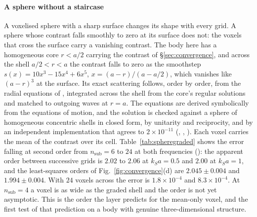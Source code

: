 \documentclass[preprint,review,12pt]{elsarticle}
\begin{document}
\paragraph{A sphere without a staircase} A voxelised sphere with a sharp surface changes its shape
with every grid. A sphere whose contrast falls smoothly to zero at its surface does not: the voxels
that cross the surface carry a vanishing contrast. The body here has a homogeneous core $r<a/2$
carrying the contrast of \S\ref{sec:convergence}, and across the shell $a/2<r<a$ the contrast falls to
zero as the smoothstep $s(x)=10x^3-15x^4+6x^5$, $x=(a-r)/(a-a/2)$, which vanishes like $(a-r)^3$ at the
surface. Its exact scattering follows, order by order, from the radial equations of
\citet{TakeuchiSaito1972}, integrated across the shell from the core's regular solutions and matched to
outgoing waves at $r=a$. The equations are derived symbolically from the equations of motion, and the
solution is checked against a sphere of homogeneous concentric shells in closed form, by unitarity and
reciprocity, and by an independent implementation that agrees to $2\times10^{-11}$
(, , ).
Each voxel carries the mean of the contrast over its cell. Table~\ref{tab:spheregraded} shows the
error falling at second order from $n_{\mathrm{sub}}=6$ to $24$ at both frequencies
(): the apparent order between successive grids is $2.02$
to $2.06$ at $k_Sa=0.5$ and $2.00$ at $k_Sa=1$, and the least-squares orders of
Fig.~\ref{fig:convergence}(d) are $2.045\pm0.004$ and $1.994\pm0.004$. With $24$ voxels across the
error is $1.8\times10^{-4}$ and $8.3\times10^{-4}$. At $n_{\mathrm{sub}}=4$ a voxel is as wide as
the graded shell and the order is not yet asymptotic. This is the order the layer predicts for the
mean-only voxel, and the first test of that prediction on a body with genuine three-dimensional
structure.
\end{document}
